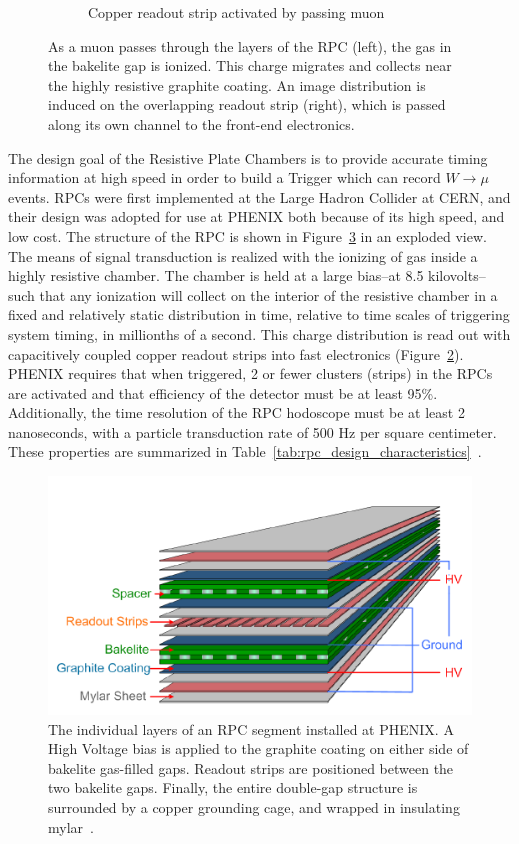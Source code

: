 \begin{figure}
\begin{subfigure}[b]{0.4\textwidth}
    \caption{Copper readout strip activated by passing muon}
    \label{fig:rpc_hit_top_view}
  \end{subfigure}
  \caption{
    As a muon passes through the layers of the RPC (left), the gas in the
    bakelite gap is ionized. This charge migrates and collects near the highly
    resistive graphite coating. An image distribution is induced on the
    overlapping readout strip (right), which is passed along its own channel to
    the front-end electronics.
  }
  \label{fig:muon_hit_rpc}
\end{figure}

The design goal of the Resistive Plate Chambers is to provide accurate timing
information at high speed in order to build a Trigger which can record
$W\rightarrow\mu$ events. RPCs were first implemented at the Large Hadron
Collider at CERN, and their design was adopted for use at PHENIX both because of
its high speed, and low cost. The structure of the RPC is shown in
Figure~\ref{fig:rpc_exploded} in an exploded view. The means of signal transduction is realized with the ionizing of gas
inside a highly resistive chamber. The chamber is held at a large bias--at 8.5
kilovolts--such that any ionization will collect on the interior of the
resistive chamber in a fixed and relatively static distribution in time,
relative to time scales of triggering system timing, in millionths of a second.
This charge distribution is read out with capacitively coupled copper readout
strips into fast electronics (Figure~\ref{fig:muon_hit_rpc}). PHENIX requires
that when triggered, 2 or fewer clusters (strips) in the RPCs are activated and
that efficiency of the detector must be at least 95\%.  Additionally, the time
resolution of the RPC hodoscope must be at least 2 nanoseconds, with a particle
transduction rate of 500 Hz per square centimeter.  These properties are
summarized in Table~\ref{tab:rpc_design_characteristics}~\cite{Fukao2011}.

\begin{figure}[ht]
  \centering
  \includegraphics[width=0.7\linewidth]{./figures/rpc_exploded.png}
  \caption{
    The individual layers of an RPC segment installed at PHENIX. A High Voltage
    bias is applied to the graphite coating on either side of bakelite
    gas-filled gaps. Readout strips are positioned between the two bakelite
    gaps. Finally, the entire double-gap structure is surrounded by a copper
    grounding cage, and wrapped in insulating mylar~\cite{Fukao2011}.
  }
  \label{fig:rpc_exploded}
\end{figure}

